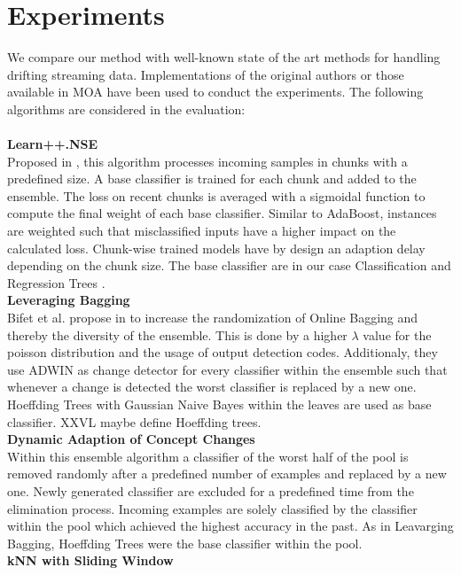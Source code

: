\documentclass[conference]{IEEEtran}
\begin{document}
\section{Experiments}
We compare our method with well-known state of the art methods for handling drifting streaming data. Implementations of the original authors or those available in MOA \cite{bifet2010moa}
have been used to conduct the experiments. The following algorithms are considered in the evaluation:\\
\\\textbf{Learn++.NSE}\\
Proposed in \cite{5975223}, this algorithm processes incoming samples in chunks with a predefined size. A base classifier is trained for each chunk and added to the ensemble. The loss on recent chunks is averaged with a sigmoidal function
to compute the final weight of each base classifier. Similar to AdaBoost, instances are weighted such that misclassified inputs have a higher impact on the calculated loss.
Chunk-wise trained models have by design an adaption delay depending on the chunk size. The base classifier are in our case Classification and Regression Trees \cite{cart84}.
\\\textbf{Leveraging Bagging}\\
Bifet et al. propose in \cite{bifet2010leveraging} to increase the randomization of Online Bagging \cite{oza2005online} and thereby the diversity of the ensemble.
This is done by a higher $\lambda$ value for the poisson distribution and the usage of output detection codes. Additionaly, they use ADWIN as change detector for every classifier within the ensemble such that whenever a change is detected 
the worst classifier is replaced by a new one. Hoeffding Trees\cite{domingos2000mining} with Gaussian Naive Bayes within the leaves are used as base classifier.
XXVL maybe define Hoeffding trees.
\\\textbf{Dynamic Adaption of Concept Changes}\\
Within this ensemble algorithm \cite{jaber2013online} a classifier of the worst half of the pool is removed randomly after a predefined number of examples and replaced by a new one. 
Newly generated classifier are excluded for a predefined time from the elimination process. Incoming examples are solely classified by the classifier within the pool which
achieved the highest accuracy in the past. As in Leavarging Bagging, Hoeffding Trees were the base classifier within the pool.
\\\textbf{kNN with Sliding Window}\\
\end{document}
